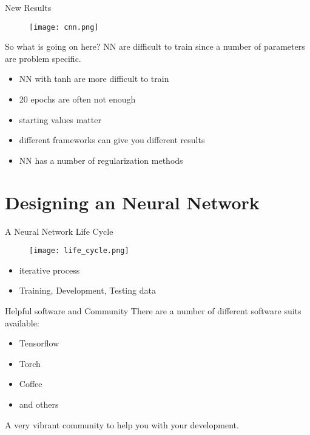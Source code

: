 \documentclass{beamer}
\begin{document}
\begin{frame}[t]{New Results}
  \begin{figure}[htpb]
    \centering
    \texttt{[image: cnn.png]}
  \end{figure}
\end{frame}

\begin{frame}[t]{So what is going on here?}
  NN are difficult to train since a number of parameters are problem specific.
  \begin{itemize}
    \item NN with tanh are more difficult to train
    \item 20 epochs are often not enough
    \item starting values matter
    \item different frameworks can give you different results
    \item NN has a number of regularization methods
  \end{itemize}
\end{frame}

\section{Designing an Neural Network}

\begin{frame}[t]{A Neural Network Life Cycle}
 \begin{figure}[htpb]
   \centering
   \texttt{[image: life\_cycle.png]}
 \end{figure} 
 \begin{itemize}
   \item iterative process
   \item Training, Development, Testing data 
 \end{itemize}
\end{frame}

\begin{frame}[t]{Helpful software and Community}
  There are a number of different software suits available:
  \begin{itemize}
    \item Tensorflow
    \item Torch
    \item Coffee
    \item and others
  \end{itemize}
  A very vibrant community to help you with your development.
\end{frame}
\end{document}
